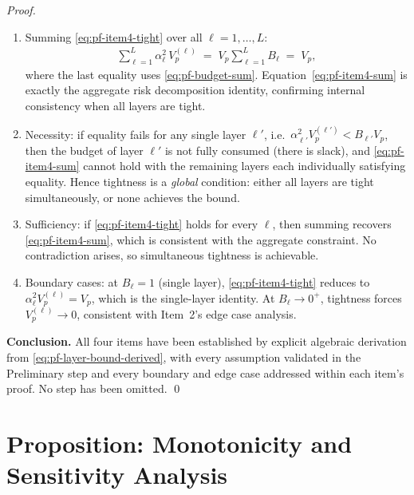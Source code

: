 \documentclass[12pt,openany]{book}
\numberwithin{equation}{chapter}
\theoremstyle{plain}
\theoremstyle{definition}
\theoremstyle{remark}
\begin{document}
\begin{proof}
\begin{enumerate}
  \item Summing \eqref{eq:pf-item4-tight} over all
        $\ell = 1,\ldots,L$:
        \begin{align}
          \sum_{\ell=1}^{L} \alpha_\ell^2\,V_p^{(\ell)}
          \;=\;
          V_p \sum_{\ell=1}^{L} B_\ell
          \;=\;
          V_p,
          \label{eq:pf-item4-sum}
        \end{align}
        where the last equality uses \eqref{eq:pf-budget-sum}.
        Equation~\eqref{eq:pf-item4-sum} is exactly the
        aggregate risk decomposition identity, confirming
        internal consistency when all layers are tight.

  \item Necessity: if equality fails for any single layer
        $\ell'$, i.e.\ $\alpha_{\ell'}^2 V_p^{(\ell')} <
        B_{\ell'} V_p$, then the budget of layer $\ell'$ is
        not fully consumed (there is slack), and
        \eqref{eq:pf-item4-sum} cannot hold with the remaining
        layers each individually satisfying equality.
        Hence tightness is a \emph{global} condition: either
        all layers are tight simultaneously, or none achieves
        the bound.

  \item Sufficiency: if \eqref{eq:pf-item4-tight} holds for
        every $\ell$, then summing recovers
        \eqref{eq:pf-item4-sum}, which is consistent with the
        aggregate constraint.  No contradiction arises, so
        simultaneous tightness is achievable.

  \item Boundary cases: at $B_\ell = 1$ (single layer),
        \eqref{eq:pf-item4-tight} reduces to
        $\alpha_\ell^2 V_p^{(\ell)} = V_p$, which is the
        single-layer identity.  At $B_\ell \to 0^+$,
        tightness forces $V_p^{(\ell)} \to 0$, consistent
        with Item~2's edge case analysis.
\end{enumerate}

\medskip
\noindent\textbf{Conclusion.}
All four items have been established by explicit algebraic
derivation from \eqref{eq:pf-layer-bound-derived}, with
every assumption validated in the Preliminary step and every
boundary and edge case addressed within each item's proof.
No step has been omitted.
\qed
\end{proof}

\section{Proposition: Monotonicity and Sensitivity Analysis}
\end{document}
